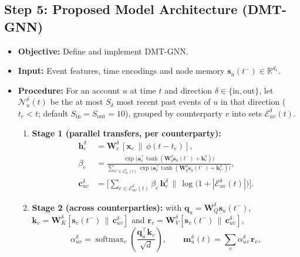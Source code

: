 \documentclass[11pt,a4paper]{article}
\begin{document}
\subsection{Step 5: Proposed Model Architecture (DMT-GNN)}
\begin{itemize}[leftmargin=*]
    \item \textbf{Objective:} Define and implement DMT-GNN.
    \item \textbf{Input:} Event features, time encodings and node memory $\mathbf{s}_u(t^-)\in\mathbb{R}^{d_s}$.
    \item \textbf{Procedure:} For an account $u$ at time $t$ and direction $\delta\in\{\text{in},\text{out}\}$, let $\mathcal{N}^{\delta}_u(t)$ be the at most $S_\delta$ most recent past events of $u$ in that direction ($t_e<t$; default $S_{\text{in}}=S_{\text{out}}=10$), grouped by counterparty $v$ into sets $\mathcal{E}^{\delta}_{uv}(t)$.
    \begin{enumerate}[leftmargin=*]
        \item \textbf{Stage 1 (parallel transfers, per counterparty):}
        \begin{align}
            \mathbf{h}^{\delta}_e &= \mathbf{W}^{\delta}_{e}\,[\mathbf{x}_e \,\|\, \phi(t-t_e)], \\
            \beta_e &= \frac{\exp\!\big(\mathbf{a}_\delta^{\top}\tanh(\mathbf{W}^{\delta}_{q}\mathbf{s}_u(t^-) + \mathbf{h}^{\delta}_e)\big)}{\sum_{e'\in\mathcal{E}^{\delta}_{uv}(t)} \exp\!\big(\mathbf{a}_\delta^{\top}\tanh(\mathbf{W}^{\delta}_{q}\mathbf{s}_u(t^-) + \mathbf{h}^{\delta}_{e'})\big)}, \\
            \mathbf{c}^{\delta}_{uv} &= \Big[\textstyle\sum_{e\in\mathcal{E}^{\delta}_{uv}(t)} \beta_e\,\mathbf{h}^{\delta}_e \,\Big\|\, \log\big(1+|\mathcal{E}^{\delta}_{uv}(t)|\big)\Big].
        \end{align}
        \item \textbf{Stage 2 (across counterparties):} with $\mathbf{q}_u=\mathbf{W}^{\delta}_{Q}\mathbf{s}_u(t^-)$, $\mathbf{k}_v=\mathbf{W}^{\delta}_{K}[\mathbf{s}_v(t^-)\,\|\,\mathbf{c}^{\delta}_{uv}]$ and $\mathbf{r}_v=\mathbf{W}^{\delta}_{V}[\mathbf{s}_v(t^-)\,\|\,\mathbf{c}^{\delta}_{uv}]$,
        \begin{equation}
            \alpha^{\delta}_{uv} = \operatorname{softmax}_{v}\!\left(\frac{\mathbf{q}_u^{\top}\mathbf{k}_v}{\sqrt{d}}\right), \qquad \mathbf{m}^{\delta}_u(t) = \sum_{v} \alpha^{\delta}_{uv}\,\mathbf{r}_v,

\end{equation}
\end{enumerate}
\end{itemize}
\end{document}

